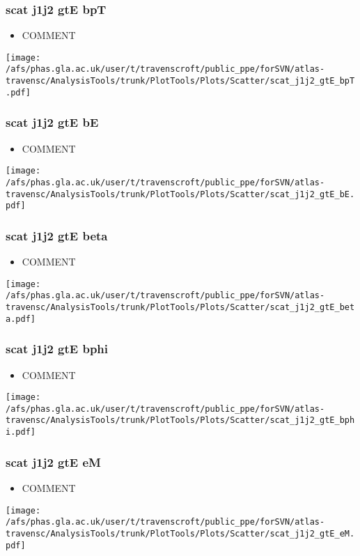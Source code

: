\documentclass{beamer}
\begin{document}
\begin{frame}
\frametitle{scat j1j2 gtE bpT}
\begin{itemize}
\item COMMENT
\end{itemize}
\begin{center}
\texttt{[image: /afs/phas.gla.ac.uk/user/t/travenscroft/public\_ppe/forSVN/atlas-travensc/AnalysisTools/trunk/PlotTools/Plots/Scatter/scat\_j1j2\_gtE\_bpT.pdf]}
\end{center}
\end{frame}

\begin{frame}
\frametitle{scat j1j2 gtE bE}
\begin{itemize}
\item COMMENT
\end{itemize}
\begin{center}
\texttt{[image: /afs/phas.gla.ac.uk/user/t/travenscroft/public\_ppe/forSVN/atlas-travensc/AnalysisTools/trunk/PlotTools/Plots/Scatter/scat\_j1j2\_gtE\_bE.pdf]}
\end{center}
\end{frame}

\begin{frame}
\frametitle{scat j1j2 gtE beta}
\begin{itemize}
\item COMMENT
\end{itemize}
\begin{center}
\texttt{[image: /afs/phas.gla.ac.uk/user/t/travenscroft/public\_ppe/forSVN/atlas-travensc/AnalysisTools/trunk/PlotTools/Plots/Scatter/scat\_j1j2\_gtE\_beta.pdf]}
\end{center}
\end{frame}

\begin{frame}
\frametitle{scat j1j2 gtE bphi}
\begin{itemize}
\item COMMENT
\end{itemize}
\begin{center}
\texttt{[image: /afs/phas.gla.ac.uk/user/t/travenscroft/public\_ppe/forSVN/atlas-travensc/AnalysisTools/trunk/PlotTools/Plots/Scatter/scat\_j1j2\_gtE\_bphi.pdf]}
\end{center}
\end{frame}

\begin{frame}
\frametitle{scat j1j2 gtE eM}
\begin{itemize}
\item COMMENT
\end{itemize}
\begin{center}
\texttt{[image: /afs/phas.gla.ac.uk/user/t/travenscroft/public\_ppe/forSVN/atlas-travensc/AnalysisTools/trunk/PlotTools/Plots/Scatter/scat\_j1j2\_gtE\_eM.pdf]}
\end{center}
\end{frame}
\end{document}
